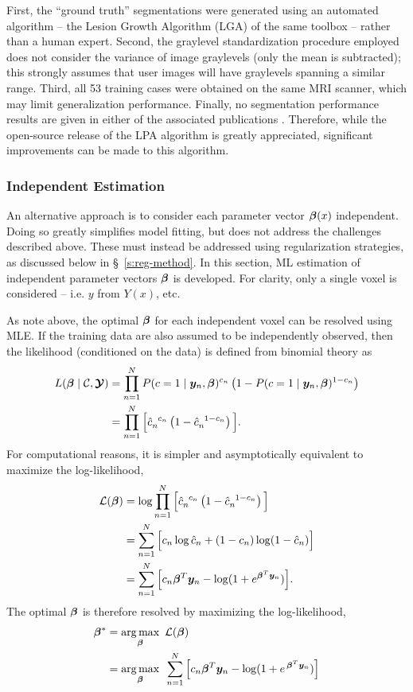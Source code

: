 First, the ``ground truth'' segmentations were generated using an automated algorithm -- the Lesion Growth Algorithm (LGA) \cite{Schmidt2012} of the same toolbox -- rather than a human expert.
Second, the graylevel standardization procedure employed does not consider the variance of image graylevels (only the mean is subtracted); this strongly assumes that user images will have graylevels spanning a similar range.
Third, all 53 training cases were obtained on the same MRI scanner, which may limit generalization performance.
Finally, no segmentation performance results are given in either of the associated publications \cite{Schmidt2017,Schmidt2017a}.
Therefore, while the open-source release of the LPA algorithm is greatly appreciated, significant improvements can be made to this algorithm.
\subsubsection{Independent Estimation}
An alternative approach is to consider each parameter vector $\bm{\beta}(x)$ independent.
Doing so greatly simplifies model fitting, but does not address the challenges described above.
These must instead be addressed using regularization strategies, as discussed below in \S\ \ref{s:reg-method}.
In this section, ML estimation of independent parameter vectors $\bm{\beta}$ is developed.
For clarity, only a single voxel is considered -- i.e. $y$ from $Y(x)$, etc.
\par
As note above, the optimal $\bm{\beta}$ for each independent voxel can be resolved using MLE.
If the training data are also assumed to be independently observed, then the likelihood (conditioned on the data) is defined from binomial theory as
\begin{align}
  L(\bm{\beta}\mid\mathcal{C},\bm{\mathcal{Y}}) &= \prod_{n=1}^{N} P(c=1\mid\bm{y}_n,\bm{\beta})^{c_n} \left(1-P(c=1\mid\bm{y}_n,\bm{\beta})^{1-c_n}\right)\nonumber\\
  &= \prod_{n=1}^{N} \Big[\hat{c}_n^{\enspace c_n} \left(1-\hat{c}_n^{\enspace 1-c_n}\right)\Big].
  \label{eq:likelihood}
\end{align}
For computational reasons, it is simpler and asymptotically equivalent to maximize the log-likelihood,
\begin{align}
\mathcal{L}(\bm{\beta}) &= \log{ \prod_{n=1}^{N} \Big[\hat{c}_n^{\enspace c_n} \left(1-\hat{c}_n^{\enspace1-c_n}\right)\Big] }\nonumber\\
&= \sum_{n=1}^{N} \Big[ c_n \log \hat{c}_n + (1-c_n) \log (1-\hat{c}_n) \Big] \nonumber\\
&= \sum_{n=1}^{N} \Big[ c_n \bm{\beta}^T\bm{y}_n - \log (1+e^{\bm{\beta}^T\bm{y}_n}) \Big].
\label{eq:loglikelihood}
\end{align}
The optimal $\bm{\beta}$ is therefore resolved by maximizing the log-likelihood,
\begin{align}
\bm{\beta}^* &= \underset{\bm{\beta}}{\arg\max} \enspace\mathcal{L}(\bm{\beta})\nonumber\\
&= \underset{\bm{\beta}}{\arg\max}\enspace\sum_{n=1}^{N} \Big[ c_n \bm{\beta}^T\bm{y}_n - \log (1+e^{\thinspace\bm{\beta}^T\bm{y}_n}) \Big]
\label{eq:argmaxmle}
\end{align}
